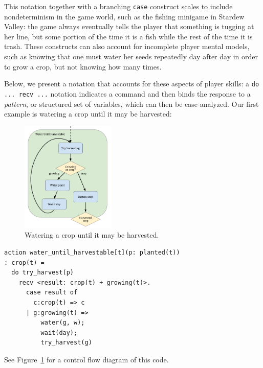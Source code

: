 This notation together with a branching \verb|case| construct
scales to include nondeterminism in the game world, such as the fishing
minigame in Stardew Valley: the game always eventually tells the player
that something is tugging at her line, but some portion of the time it is a
fish while the rest of the time it is trash.  These constructs can also
account for incomplete player mental models, such as knowing that one must
water her seeds repeatedly day after day in order to grow a crop, but not
knowing how many times.

Below, we present a notation that accounts for these aspects of player
skills: a \verb|do ... recv ...| notation indicates a command and then
binds the response to a {\em pattern}, or structured set of variables,
which can then be case-analyzed.
Our first example is watering a crop until it may be harvested:
%
\begin{figure}[t]
  \includegraphics[width=0.4\textwidth]{sdv-water-harvest.png}
  \caption{Watering a crop until it may be harvested.}
  \label{fig:harvest}
\end{figure}
%
\begin{verbatim}
action water_until_harvestable[t](p: planted(t))
: crop(t) =
  do try_harvest(p)
    recv <result: crop(t) + growing(t)>.
      case result of
        c:crop(t) => c
      | g:growing(t) => 
          water(g, w); 
          wait(day); 
          try_harvest(g)
\end{verbatim}
See Figure~\ref{fig:harvest} for a control flow diagram of this code.

